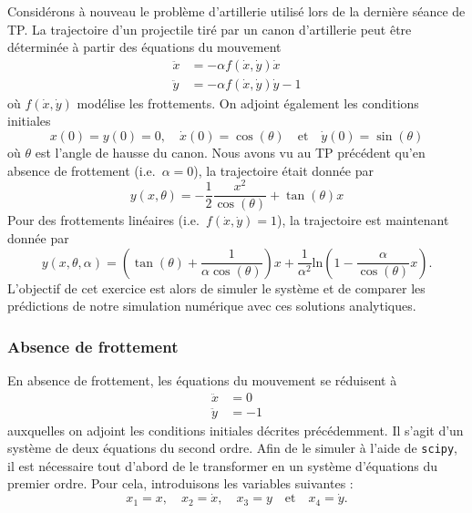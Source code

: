 \documentclass[a4paper,12pt]{article} %
\begin{document}
Considérons à nouveau le problème d'artillerie utilisé lors de la dernière séance de TP.
La trajectoire d'un projectile tiré par un canon d'artillerie peut être déterminée à partir des équations du mouvement
%
\[
\begin{aligned}
  \ddot{x} & = -\alpha f(\dot{x}, \dot{y})\dot{x}\\
  \ddot{y} & = -\alpha f(\dot{x}, \dot{y}) \dot{y} - 1
\end{aligned}
\]
%
où $f(\dot{x}, \dot{y})$ modélise les frottements.
On adjoint également les conditions initiales
%
\[
x(0) = y(0) = 0, \quad \dot{x}(0) = \cos(\theta) \quad \text{et} \quad \dot{y}(0) = \sin(\theta)
\]
%
où $\theta$ est l'angle de hausse du canon.
Nous avons vu au TP précédent qu'en absence de frottement (i.e.\ $\alpha = 0$), la trajectoire était donnée par
%
\[
y(x, \theta) = -\dfrac{1}{2} \dfrac{x^2}{\cos(\theta)} + \tan(\theta)x
\]
%
Pour des frottements linéaires (i.e.\ $f(\dot{x}, \dot{y}) = 1$), la trajectoire est maintenant donnée par
%
\[
y(x, \theta, \alpha) = \left( \tan(\theta) + \dfrac{1}{\alpha \cos(\theta)} \right) x + \dfrac{1}{\alpha^2} \mathrm{ln} \left( 1 - \dfrac{\alpha}{\cos(\theta)}x \right).
\]
%
L'objectif de cet exercice est alors de simuler le système et de comparer les prédictions de notre simulation numérique avec ces solutions analytiques.

\subsubsection*{Absence de frottement}

En absence de frottement, les équations du mouvement se réduisent à
%
\[
\begin{aligned}
  \ddot{x} & = 0 \\
  \ddot{y} & = -1
\end{aligned}
\]
%
auxquelles on adjoint les conditions initiales décrites précédemment.
Il s'agit d'un système de deux équations du second ordre.
Afin de le simuler à l'aide de \verb+scipy+, il est nécessaire tout d'abord de le transformer en un système d'équations du premier ordre.
Pour cela, introduisons les variables suivantes :
%
\[
x_1 = x, \quad x_2 = \dot{x}, \quad x_3 = y \quad \text{et} \quad x_4 = \dot{y}.
\]
\end{document}

